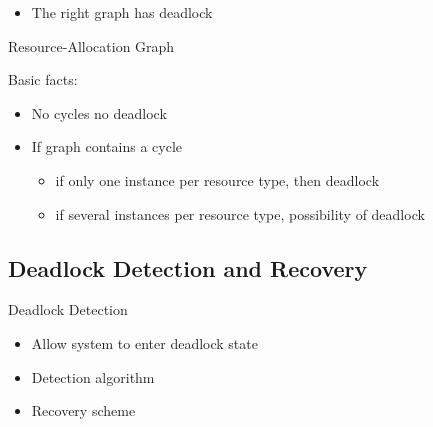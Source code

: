 \begin{itemize}
\item The right graph has deadlock
\end{itemize}

\begin{frame}{Resource-Allocation Graph}
  \begin{minipage}{.29\linewidth}
    \begin{center}
    \end{center}
  \end{minipage}\hfill
  \begin{minipage}{.69\linewidth}
    \begin{block}{Basic facts:}
      \begin{itemize}
      \item No cycles  no deadlock
      \item If graph contains a cycle 
        \begin{itemize}
        \item if only one instance per resource type, then deadlock
        \item if several instances per resource type, possibility of deadlock
        \end{itemize}
      \end{itemize}
    \end{block}
  \end{minipage}
\end{frame}

\subsection{Deadlock Detection and Recovery}
\label{sec:deadl-detect-recov}

\begin{frame}{Deadlock Detection}
  \begin{itemize}
  \item Allow system to enter deadlock state
  \item Detection algorithm
  \item Recovery scheme
  \end{itemize}
\end{frame}

